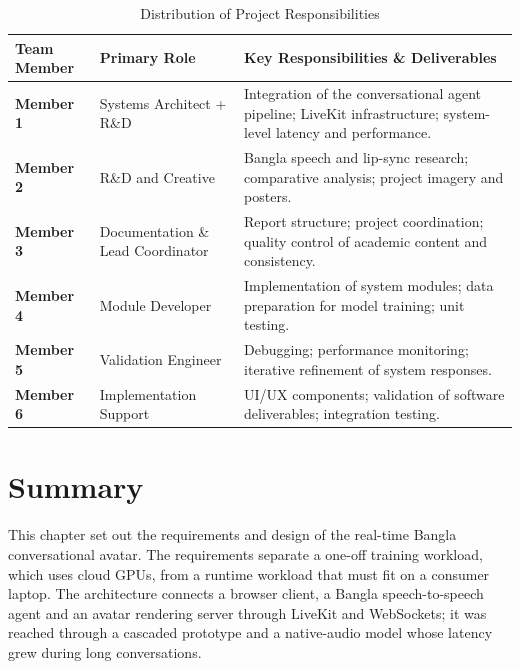 \begin{table}[H]
\centering
\caption{Distribution of Project Responsibilities}
\renewcommand{\arraystretch}{1.3}
\begin{tabular}{|p{2.5cm}|p{3.5cm}|p{7.5cm}|}
\hline
\textbf{Team Member} & \textbf{Primary Role} & \textbf{Key Responsibilities \& Deliverables} \\
\hline

\textbf{Member 1} & Systems Architect + R\&D &
Integration of the conversational agent pipeline; LiveKit infrastructure; system-level latency and performance. \\
\hline

\textbf{Member 2} & R\&D and Creative &
Bangla speech and lip-sync research; comparative analysis; project imagery and posters. \\
\hline

\textbf{Member 3} & Documentation \& Lead Coordinator &
Report structure; project coordination; quality control of academic content and consistency. \\
\hline

\textbf{Member 4} & Module Developer &
Implementation of system modules; data preparation for model training; unit testing. \\
\hline

\textbf{Member 5} & Validation Engineer &
Debugging; performance monitoring; iterative refinement of system responses. \\
\hline

\textbf{Member 6} & Implementation Support &
UI/UX components; validation of software deliverables; integration testing. \\
\hline

\end{tabular}
\label{tab:project_responsibilities}
\end{table}




\section{Summary}

This chapter set out the requirements and design of the real-time Bangla conversational avatar. The requirements separate a one-off training workload, which uses cloud GPUs, from a runtime workload that must fit on a consumer laptop. The architecture connects a browser client, a Bangla speech-to-speech agent and an avatar rendering server through LiveKit and WebSockets; it was reached through a cascaded prototype and a native-audio model whose latency grew during long conversations.\\

